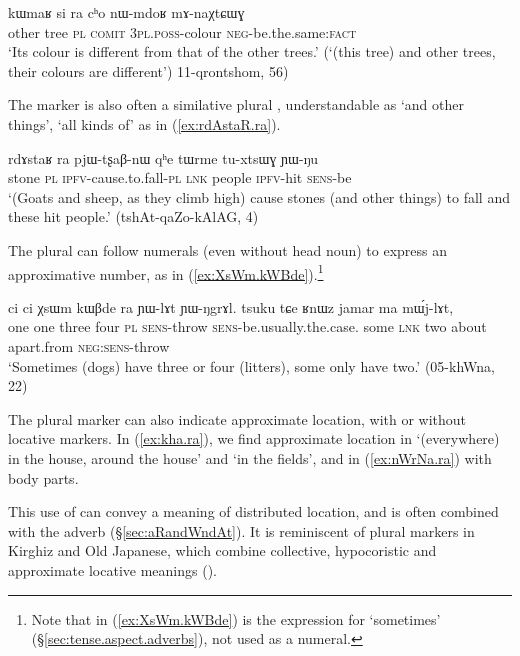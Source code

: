 \begin{exe}
\ex \label{ex:si.ra.cho}
\gll kɯmaʁ si ra cʰo nɯ-mdoʁ mɤ-naχtɕɯɣ \\
other tree \textsc{pl} \textsc{comit} \textsc{3pl}.\textsc{poss}-colour \textsc{neg}-be.the.same:\textsc{fact} \\
\glt `Its colour is different from that of the other trees.' (`(this tree) and other trees, their colours are different') 11-qrontshom, 56)
\end{exe} 

The marker  is also often a similative plural \citep{mauri18categorization}, understandable as `and other things', `all kinds of' as in (\ref{ex:rdAstaR.ra}).

\begin{exe}
\ex \label{ex:rdAstaR.ra}
\gll rdɤstaʁ ra pjɯ-tʂaβ-nɯ qʰe tɯrme tu-xtsɯɣ ɲɯ-ŋu \\
stone \textsc{pl} \textsc{ipfv}-cause.to.fall-\textsc{pl} \textsc{lnk} people \textsc{ipfv}-hit \textsc{sens}-be \\
\glt `(Goats and sheep, as they climb high) cause stones (and other things) to fall and these hit people.' (tshAt-qaZo-kAlAG, 4)
\end{exe} 

The plural can follow numerals (even without head noun) to express an approximative number, as in (\ref{ex:XsWm.kWBde}).\footnote{Note that in (\ref{ex:XsWm.kWBde})  is the expression for `sometimes' (§\ref{sec:tense.aspect.adverbs}), not used as a numeral.} 

\begin{exe}
\ex \label{ex:XsWm.kWBde}
\gll ci ci χsɯm kɯβde ra ɲɯ-lɤt ɲɯ-ŋgrɤl. tsuku tɕe ʁnɯz jamar ma mɯ́j-lɤt,\\
one one three four \textsc{pl} \textsc{sens}-throw \textsc{sens}-be.usually.the.case. some \textsc{lnk} two about apart.from \textsc{neg}:\textsc{sens}-throw \\
\glt  `Sometimes (dogs) have three or four (litters), some only have two.' (05-khWna, 22)
\end{exe} 

The plural marker  can also indicate approximate location, with or without locative markers. In (\ref{ex:kha.ra}), we find approximate location  in  `(everywhere) in the house, around the house' and  `in the fields', and in (\ref{ex:nWrNa.ra}) with body parts.

This use of  can convey a meaning of distributed location, and is often combined with the adverb  (§\ref{sec:aRandWndAt}). It is reminiscent of plural markers in Kirghiz and Old Japanese, which combine collective, hypocoristic and approximate locative meanings (\citealt[195]{antonov07ra}).

